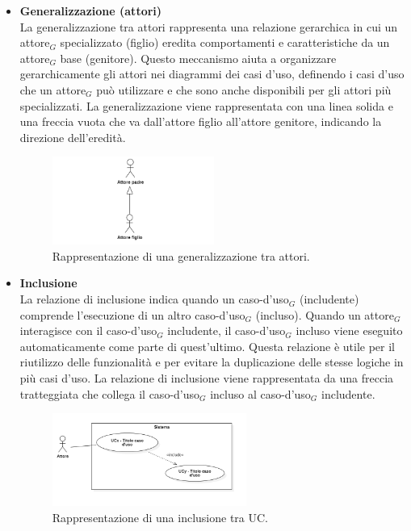 \documentclass[10pt]{article}
\begin{document}
\begin{justify}
\begin{itemize}
            \item \textbf{Generalizzazione (attori)}\\
            La generalizzazione tra attori rappresenta una relazione gerarchica in cui un attore$_G$ specializzato (figlio) eredita comportamenti e caratteristiche da un attore$_G$ base (genitore). Questo meccanismo aiuta a organizzare gerarchicamente gli attori nei diagrammi dei casi d'uso, definendo i casi d'uso che un attore$_G$ può utilizzare e che sono anche disponibili per gli attori più specializzati. La generalizzazione viene rappresentata con una linea solida e una freccia vuota che va dall'attore figlio all'attore genitore, indicando la direzione dell'eredità.
            \begin{figure}[H]
            \centering
            \includegraphics[width=0.5\textwidth]{GeneralizzazioneAttore.PNG}
            \caption{Rappresentazione di una generalizzazione tra attori.}
            \end{figure}

            \item \textbf{Inclusione}\\
            La relazione di inclusione indica quando un caso-d'uso$_G$ (includente) comprende l'esecuzione di un altro caso-d'uso$_G$ (incluso). Quando un attore$_G$ interagisce con il caso-d'uso$_G$ includente, il caso-d'uso$_G$ incluso viene eseguito automaticamente come parte di quest'ultimo. Questa relazione è utile per il riutilizzo delle funzionalità e per evitare la duplicazione delle stesse logiche in più casi d'uso. La relazione di inclusione viene rappresentata da una freccia tratteggiata che collega il caso-d'uso$_G$ incluso al caso-d'uso$_G$ includente.
            \begin{figure}[H]
            \centering
            \includegraphics[width=0.6\textwidth]{InclusioneUC.PNG}
            \caption{Rappresentazione di una inclusione tra UC.}
            \end{figure}


\end{itemize}
\end{justify}
\end{document}
